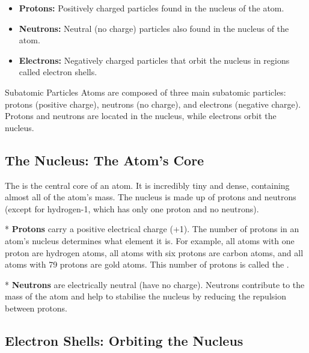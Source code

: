 \begin{itemize}
    \item \textbf{Protons:} Positively charged particles found in the nucleus of the atom.
    \item \textbf{Neutrons:} Neutral (no charge) particles also found in the nucleus of the atom.
    \item \textbf{Electrons:} Negatively charged particles that orbit the nucleus in regions called electron shells.
\end{itemize}

\begin{keyconcept}{Subatomic Particles}
Atoms are composed of three main subatomic particles: protons (positive charge), neutrons (no charge), and electrons (negative charge). Protons and neutrons are located in the nucleus, while electrons orbit the nucleus.
\end{keyconcept}

\subsection{The Nucleus: The Atom's Core}


The  is the central core of an atom. It is incredibly tiny and dense, containing almost all of the atom's mass. The nucleus is made up of protons and neutrons (except for hydrogen-1, which has only one proton and no neutrons).

* \textbf{Protons} carry a positive electrical charge (+1). The number of protons in an atom's nucleus determines what element it is. For example, all atoms with one proton are hydrogen atoms, all atoms with six protons are carbon atoms, and all atoms with 79 protons are gold atoms. This number of protons is called the .

* \textbf{Neutrons} are electrically neutral (have no charge). Neutrons contribute to the mass of the atom and help to stabilise the nucleus by reducing the repulsion between protons.

\subsection{Electron Shells: Orbiting the Nucleus}

